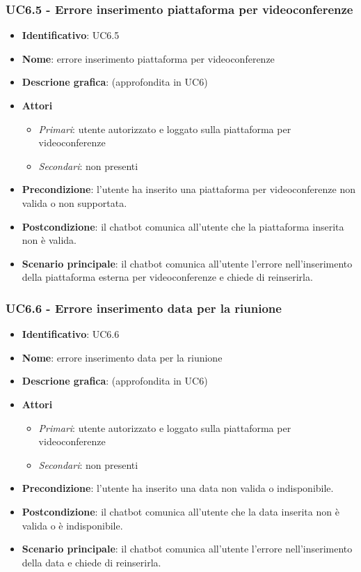 \subsubsection{UC6.5 - Errore inserimento piattaforma per videoconferenze}
\begin{itemize}
    \item \textbf{Identificativo}: UC6.5
    \item \textbf{Nome}: errore inserimento piattaforma per videoconferenze
    \item \textbf{Descrione grafica}: (approfondita in UC6)
    \item \textbf{Attori}
 \begin{itemize} 
    \item \textit{Primari}: utente autorizzato e loggato sulla piattaforma per videoconferenze
    \item \textit{Secondari}: non presenti
 \end{itemize}
 \item \textbf{Precondizione}: l'utente ha inserito una piattaforma per videoconferenze non valida o non supportata.
 \item \textbf{Postcondizione}: il chatbot comunica all'utente che la piattaforma inserita non è valida.
 \item \textbf{Scenario principale}: il chatbot comunica all'utente l'errore nell'inserimento della piattaforma esterna per videoconferenze e chiede di reinserirla.
\end{itemize}
\subsubsection{UC6.6 - Errore inserimento data per la riunione}
\begin{itemize}
    \item \textbf{Identificativo}: UC6.6
    \item \textbf{Nome}: errore inserimento data per la riunione
    \item \textbf{Descrione grafica}: (approfondita in UC6)
    \item \textbf{Attori}
 \begin{itemize} 
    \item \textit{Primari}: utente autorizzato e loggato sulla piattaforma per videoconferenze
    \item \textit{Secondari}: non presenti
 \end{itemize}
 \item \textbf{Precondizione}: l'utente ha inserito una data non valida o indisponibile.
 \item \textbf{Postcondizione}: il chatbot comunica all'utente che la data inserita non è valida o è indisponibile.
 \item \textbf{Scenario principale}: il chatbot comunica all'utente l'errore nell'inserimento della data e chiede di reinserirla.
\end{itemize}
